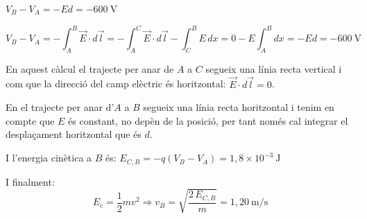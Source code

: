 \begin{solapartat}
 $V_B - V_A = -Ed = -600\ \mathrm{V}$

\[ V_B-V_A = -\int_A^B \vec{E}\cdot d\vec{l} = -\int_A^C \vec{E}\cdot d\vec{l} - \int_C^B E\,dx = 0 - E\int_A^B dx = -Ed = -600\ \mathrm{V} \]

En aquest càlcul el trajecte per anar de $A$ a $C$ segueix una línia recta vertical i com que la direcció del camp elèctric és horitzontal: $\vec{E}\cdot d\vec{l} = 0$.

En el trajecte per anar d'$A$ a $B$ segueix una línia recta horitzontal i tenim en compte que $E$ és constant, no depèn de la posició, per tant només cal integrar el desplaçament horitzontal que és $d$.

 I l'energia cinètica a $B$ és: $E_{C,B} = -q(V_B-V_A) = 1,8\times 10^{-3}\ \mathrm{J}$

I finalment:
\[ E_c = \frac{1}{2}mv^2 \Rightarrow v_B = \sqrt{\frac{2\,E_{C,B}}{m}} = 1,20\ \mathrm{m/s} \] 
\end{solapartat}
